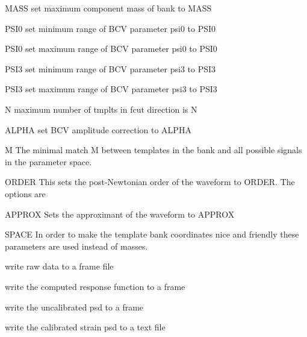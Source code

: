 \begin{entry}
\item[\option{--maximum-mass} \textsc{MASS}] set maximum component mass of bank to MASS
\item[\option{--minimum-psi0} \textsc{ PSI0}] set minimum range of BCV parameter psi0 to PSI0
\item[\option{--maximum-psi0} \textsc{ PSI0}] set maximum range of BCV parameter psi0 to PSI0
\item[\option{--minimum-psi3} \textsc{ PSI3}] set minimum range of BCV parameter psi3 to PSI3
\item[\option{--maximum-psi3} \textsc{ PSI3}] set maximum range of BCV parameter psi3 to PSI3
\item[\option{-maximum-fcut-tmplts} \textsc{ N}] maximum number of tmplts in fcut direction is N
\item[\option{--alpha} \textsc{ ALPHA}] set BCV amplitude correction to ALPHA
\item[\option{--minimal-match} \textsc{ M}] The minimal match M between templates in the 
bank and all possible signals in the parameter space. 
\item[\option{--order} \textsc{ ORDER}] This sets the post-Newtonian order of the waveform to
ORDER.  The options are 
\item[\option{--approximant} \textsc{ APPROX}] Sets the approximant of the waveform to APPROX
\item[\option{--space} \textsc{ SPACE}] In order to make the template bank coordinates nice
and friendly these parameters are used instead of masses.  
\item[\option{--write-raw-data}] write raw data to a frame file
\item[\option{--write-response}] write the computed response function to a frame
\item[\option{--write-spectrum}] write the uncalibrated psd to a frame
\item[\option{--write-strain-spectrum}] write the calibrated strain psd to a text file
\end{entry}

